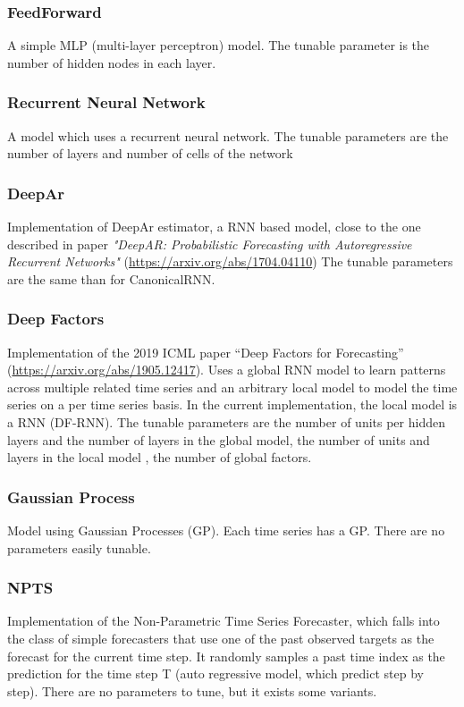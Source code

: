 \documentclass[a4paper, 12pt]{article}
\begin{document}
\subsubsection{FeedForward} \label{descr_feedfordward}
A simple MLP (multi-layer perceptron) model.
The tunable parameter is the number of hidden nodes in each layer.

\subsubsection{Recurrent Neural Network} \label{descr_canonicalRNN}
A model which uses a recurrent neural network.
The tunable parameters are the number of layers and number of cells of the network

\subsubsection{DeepAr} \label{descr_deepar}
Implementation of DeepAr estimator, a RNN based model, close to the one described in paper 
\textit{"DeepAR: Probabilistic Forecasting with Autoregressive Recurrent Networks"} (\url{https://arxiv.org/abs/1704.04110})
The tunable parameters are the same than for CanonicalRNN.

\subsubsection{Deep Factors} \label{descr_deepfactor}
Implementation of the 2019 ICML paper “Deep Factors for Forecasting” (\url{https://arxiv.org/abs/1905.12417}).
Uses a global RNN model to learn patterns across multiple related time series and an arbitrary local model to model the time series on a per time series basis. 
In the current implementation, the local model is a RNN (DF-RNN).
The tunable parameters are the number of units per hidden layers and the number of layers in the global model, the number of units and layers in the local model
, the number of global factors.

\subsubsection{Gaussian Process} \label{descr_gp}
Model using Gaussian Processes (GP).
Each time series has a GP.
There are no parameters easily tunable.

\subsubsection{NPTS} \label{descr_npts}
Implementation of the Non-Parametric Time Series Forecaster, 
which falls into the class of simple forecasters that use one of the past observed targets as the forecast for 
the current time step. It randomly samples a past time index as the prediction for the time step T (auto regressive model, which predict step by step).
There are no parameters to tune, but it exists some variants.
\end{document}
